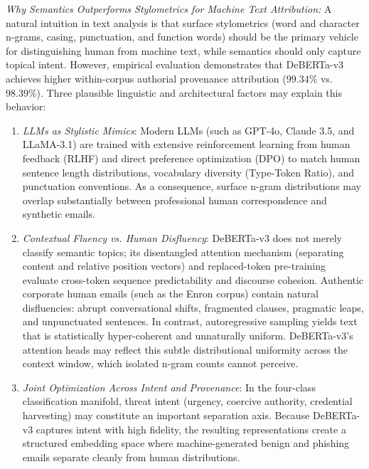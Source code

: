 \documentclass[journal]{IEEEtran}
\begin{document}
\emph{Why Semantics Outperforms Stylometrics for Machine Text Attribution:} A natural intuition in text analysis is that surface stylometrics (word and character n-grams, casing, punctuation, and function words) should be the primary vehicle for distinguishing human from machine text, while semantics should only capture topical intent. However, empirical evaluation demonstrates that DeBERTa-v3 achieves higher within-corpus authorial provenance attribution ($99.34\%$ vs. $98.39\%$). Three plausible linguistic and architectural factors may explain this behavior:
\begin{enumerate}
    \item \emph{LLMs as Stylistic Mimics}: Modern LLMs (such as GPT-4o, Claude 3.5, and LLaMA-3.1) are trained with extensive reinforcement learning from human feedback (RLHF) and direct preference optimization (DPO) to match human sentence length distributions, vocabulary diversity (Type-Token Ratio), and punctuation conventions. As a consequence, surface n-gram distributions may overlap substantially between professional human correspondence and synthetic emails.
    \item \emph{Contextual Fluency vs. Human Disfluency}: DeBERTa-v3 does not merely classify semantic topics; its disentangled attention mechanism (separating content and relative position vectors) and replaced-token pre-training evaluate cross-token sequence predictability and discourse cohesion. Authentic corporate human emails (such as the Enron corpus) contain natural disfluencies: abrupt conversational shifts, fragmented clauses, pragmatic leaps, and unpunctuated sentences. In contrast, autoregressive sampling yields text that is statistically hyper-coherent and unnaturally uniform. DeBERTa-v3's attention heads may reflect this subtle distributional uniformity across the context window, which isolated n-gram counts cannot perceive.
    \item \emph{Joint Optimization Across Intent and Provenance}: In the four-class classification manifold, threat intent (urgency, coercive authority, credential harvesting) may constitute an important separation axis. Because DeBERTa-v3 captures intent with high fidelity, the resulting representations create a structured embedding space where machine-generated benign and phishing emails separate cleanly from human distributions.
\end{enumerate}
\end{document}

